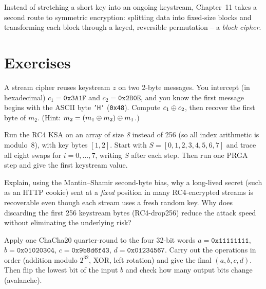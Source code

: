 Instead of stretching a short key into an ongoing keystream, Chapter~11 takes a second route to symmetric encryption: splitting data into fixed-size blocks and transforming each block through a keyed, reversible permutation -- a \emph{block cipher}.

\section{Exercises}
\label{ch10:exercises}

\begin{exercise}
\label{ch10:ex-twotime-recover}
A stream cipher reuses keystream $z$ on two 2-byte messages. You intercept (in hexadecimal) $c_1 = \texttt{0x3A1F}$ and $c_2 = \texttt{0x2B0E}$, and you know the first message begins with the ASCII byte \texttt{'H'} (\texttt{0x48}). Compute $c_1 \oplus c_2$, then recover the first byte of $m_2$. (Hint: $m_2 = (m_1 \oplus m_2) \oplus m_1$.)
\end{exercise}

\begin{exercise}
\label{ch10:ex-rc4-ksa}
Run the RC4 KSA on an array of size \emph{8} instead of 256 (so all index arithmetic is modulo~8), with key bytes $[1, 2]$. Start with $S = [0,1,2,3,4,5,6,7]$ and trace all eight swaps for $i = 0, \dots, 7$, writing $S$ after each step. Then run one PRGA step and give the first keystream value.
\end{exercise}

\begin{exercise}
\label{ch10:ex-rc4-drop}
Explain, using the Mantin--Shamir second-byte bias, why a long-lived secret (such as an HTTP cookie) sent at a \emph{fixed} position in many RC4-encrypted streams is recoverable even though each stream uses a fresh random key. Why does discarding the first 256 keystream bytes (RC4-drop256) reduce the attack speed without eliminating the underlying risk?
\end{exercise}

\begin{exercise}
\label{ch10:ex-chacha-qr}
Apply one ChaCha20 quarter-round to the four 32-bit words $a = \texttt{0x11111111}$, $b = \texttt{0x01020304}$, $c = \texttt{0x9b8d6f43}$, $d = \texttt{0x01234567}$. Carry out the operations in order (addition modulo $2^{32}$, XOR, left rotation) and give the final $(a,b,c,d)$. Then flip the lowest bit of the input $b$ and check how many output bits change (avalanche).
\end{exercise}

